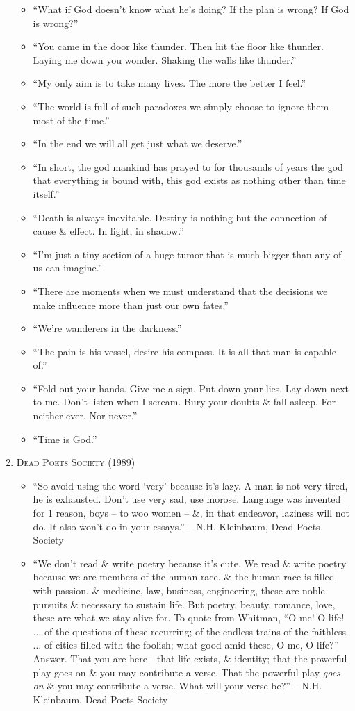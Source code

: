 \documentclass{article}
\numberwithin{equation}{section}
\begin{document}
\begin{enumerate}
\begin{itemize}
		\item ``What if God doesn't know what he's doing? If the plan is wrong? If God is wrong?''
		\item ``You came in the door like thunder. Then hit the floor like thunder. Laying me down you wonder. Shaking the walls like thunder.''
		\item ``My only aim is to take many lives. The more the better I feel.''
		\item ``The world is full of such paradoxes we simply choose to ignore them most of the time.''
		\item ``In the end we will all get just what we deserve.''
		\item ``In short, the god mankind has prayed to for thousands of years the god that everything is bound with, this god exists as nothing other than time itself.''
		\item ``Death is always inevitable. Destiny is nothing but the connection of cause \& effect. In light, in shadow.''
		\item ``I'm just a tiny section of a huge tumor that is much bigger than any of us can imagine.''
		\item ``There are moments when we must understand that the decisions we make influence more than just our own fates.''
		\item ``We're wanderers in the darkness.''
		\item ``The pain is his vessel, desire his compass. It is all that man is capable of.''
		\item ``Fold out your hands. Give me a sign. Put down your lies. Lay down next to me. Don't listen when I scream. Bury your doubts \& fall asleep. For neither ever. Nor never.''
		\item ``Time is God.''
	\end{itemize}	
	\item \textsc{Dead Poets Society} (1989)
	\begin{itemize}
		\item ``So avoid using the word `very' because it's lazy. A man is not very tired, he is exhausted. Don't use very sad, use morose. Language was invented for 1 reason, boys -- to woo women -- \&, in that endeavor, laziness will not do. It also won't do in your essays.'' --  N.H. Kleinbaum, Dead Poets Society
		\item ``We don't read \& write poetry because it's cute. We read \& write poetry because we are members of the human race. \& the human race is filled with passion. \& medicine, law, business, engineering, these are noble pursuits \& necessary to sustain life. But poetry, beauty, romance, love, these are what we stay alive for. To quote from Whitman, ``O me! O life! $\ldots$ of the questions of these recurring; of the endless trains of the faithless $\ldots$ of cities filled with the foolish; what good amid these, O me, O life?'' Answer. That you are here - that life exists, \& identity; that the powerful play goes on \& you may contribute a verse. That the powerful play \emph{goes on} \& you may contribute a verse. What will your verse be?'' --  N.H. Kleinbaum, Dead Poets Society

\end{itemize}
\end{enumerate}
\end{document}
